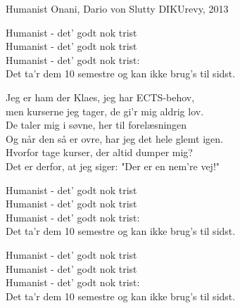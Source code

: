 \begin{song}{Humanist}
  {} %
  {Onani, Dario von Slutty} %
  {} %
  {DIKUrevy, 2013} %
  {\NotCCLIed} %

  \begin{SBChorus}
    Humanist - det' godt nok trist\\
    Humanist - det' godt nok trist\\
    Humanist - det' godt nok trist:\\
    Det ta'r dem 10 semestre og kan ikke brug's til sidst.
  \end{SBChorus}

  \begin{SBVerse}
    Jeg er ham der Klaes, jeg har ECTS-behov,\\
    men kurserne jeg tager, de gi'r mig aldrig lov.\\
    De taler mig i søvne, her til forelæsningen\\
    Og når den så er ovre, har jeg det hele glemt igen.\\
    Hvorfor tage kurser, der altid dumper mig?\\
    Det er derfor, at jeg siger: "Der er en nem're vej!"
  \end{SBVerse}

  \begin{SBChorus}
    Humanist - det' godt nok trist\\
    Humanist - det' godt nok trist\\
    Humanist - det' godt nok trist:\\
    Det ta'r dem 10 semestre og kan ikke brug's til sidst.
  \end{SBChorus}

  \begin{SBChorus}
    Humanist - det' godt nok trist\\
    Humanist - det' godt nok trist\\
    Humanist - det' godt nok trist:\\
    Det ta'r dem 10 semestre og kan ikke brug's til sidst.
  \end{SBChorus}



\end{song}
